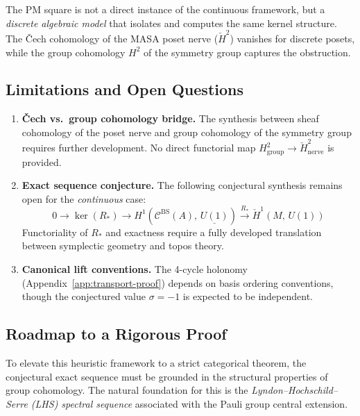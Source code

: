 \documentclass[11pt]{article}
\begin{document}
The PM square is not a direct instance of the continuous framework, but
a \emph{discrete algebraic model} that isolates and computes the same
kernel structure. The \v{C}ech cohomology of the MASA poset nerve
($\check{H}^2$) vanishes for discrete posets, while the group cohomology
$H^2$ of the symmetry group captures the obstruction.

\subsection{Limitations and Open Questions}

\begin{enumerate}
  \item \textbf{Čech vs.\ group cohomology bridge.} The synthesis between
        sheaf cohomology of the poset nerve and group cohomology of the
        symmetry group requires further development. No direct functorial
        map $H^2_{\text{group}} \to \check{H}^2_{\text{nerve}}$ is provided.

  \item \textbf{Exact sequence conjecture.} The following conjectural
        synthesis remains open for the \emph{continuous} case:
        \[
          0 \longrightarrow \ker(R_*)
          \longrightarrow H^1(\mathcal{C}^{\mathrm{BS}}(A),\, \underline{U(1)})
          \xrightarrow{R_*} \check{H}^1(M,\, U(1))
        \]
        Functoriality of $R_*$ and exactness require a fully developed
        translation between symplectic geometry and topos theory.

  \item \textbf{Canonical lift conventions.} The 4-cycle holonomy
        (Appendix~\ref{app:transport-proof}) depends on basis ordering
        conventions, though the conjectured value $\sigma = -1$ is expected to be independent.
\end{enumerate}

\subsection{Roadmap to a Rigorous Proof}
\label{subsec:roadmap}

To elevate this heuristic framework to a strict categorical theorem, the conjectural exact sequence must be grounded in the structural properties of group cohomology. The natural foundation for this is the \emph{Lyndon--Hochschild--Serre (LHS) spectral sequence} associated with the Pauli group central extension.
\end{document}

